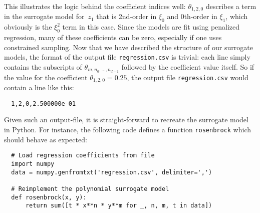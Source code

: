 \documentclass[a4paper,bibliography=numbered]{scrartcl}
\begin{document}
This illustrates the logic behind the coefficient indices well: $\theta_{1,2,0}$ describes a term in the surrogate model for~$z_1$ that is 2nd-order in $\xi_0$ and 0th-order in $\xi_1$, which obviously is the $\xi_0^2$ term in this case.
Since the models are fit using penalized regression, many of these coefficients can be zero, especially if one uses constrained sampling.
Now that we have described the structure of our surrogate models, the format of the output file \texttt{regression.csv} is trivial: each line simply contains the subscripts of $\theta_{m,n_0,\ldots,n_{d-1}}$ followed by the coefficient value itself.
So if the value for the coefficient $\theta_{1,2,0} = 0.25$, the output file \texttt{regression.csv} would contain a line like this:
\begin{lstlisting}
  1,2,0,2.500000e-01
\end{lstlisting}
Given such an output-file, it is straight-forward to recreate the surrogate model in Python.
For instance, the following code defines a function \texttt{rosenbrock} which should behave as expected:
\begin{lstlisting}
  # Load regression coefficients from file
  import numpy
  data = numpy.genfromtxt('regression.csv', delimiter=',')

  # Reimplement the polynomial surrogate model
  def rosenbrock(x, y):
      return sum([t * x**n * y**m for _, n, m, t in data])
\end{lstlisting}
\end{document}

